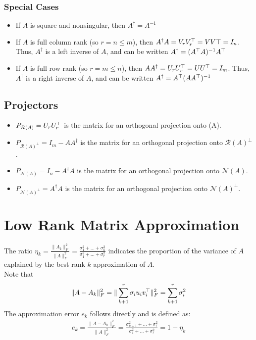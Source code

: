 \documentclass[12pt]{article}
\begin{document}
\subsubsection*{Special Cases}
\begin{itemize}
    \item If $A$ is square and nonsingular, then $A^\dagger = A^{-1}$
    \item If $A$ is full column rank (so $r = n \leq m$), then $A^\dagger A = V_r V_r^\top = VV\top = I_n$. Thus, $A^\dagger$ is a left inverse of $A$, and can be written $A^\dagger = (A^\top A)^{-1}A^\top$
    \item  If $A$ is full row rank (so $r = m \leq n$), then $AA^\dagger = U_r U_r^\top = UU^\top = I_m$. Thus, $A^\dagger$ is a right inverse of $A$, and can be written $A^\dagger = A^\top (AA^\top)^{-1}$
\end{itemize}
\subsection*{Projectors}
\begin{itemize}
    \item $P_{\mathcal{R}(A)}= U_rU_r^\top$ is the matrix for an orthogonal projection onto (A).
    \item $P_{\mathcal{R}(A)^\perp}= I_m -AA^\dagger$ is the matrix for an orthogonal projection onto $\mathcal{R}(A)^\perp$.
     \item $P_{\mathcal{N}(A)}= I_n -A^\dagger A$ is the matrix for an orthogonal projection onto $\mathcal{N}(A)$.
    \item $P_{\mathcal{N}(A)^\perp}= A^\dagger A$ is the matrix for an orthogonal projection onto $\mathcal{N}(A)^\perp$.
\end{itemize}


\section{Low Rank Matrix Approximation}
The ratio $\eta_k = \frac{\|A_k\|_F^2}{\|A\|_F^2} = \frac{\sigma_1^2+...+ \sigma_k^2}{\sigma_1^2+...+ \sigma_r^2}$ indicates the proportion of the variance of $A$ explained by the best rank $k$ approximation of $A$.\\
Note that
\begin{gather*}
    \|A - A_k\|_F^2 = \|\sum_{k+1}^r \sigma_i u_i v_i^\top\|_F^2 = \sum_{k+1}^r \sigma_i^2
\end{gather*}
The approximation error $e_k$ follows directly and is defined as:
\begin{gather*}
  e_k =  \frac{\|A - A_k\|_F^2}{\|A\|_F^2} = \frac{\sigma_{k+1}^2+...+ \sigma_r^2}{\sigma_1^2+...+ \sigma_r^2} = 1 - \eta_k
\end{gather*}
\end{document}
